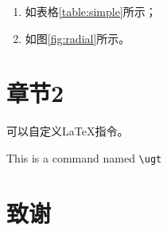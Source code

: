 \documentclass[titlepage,openany]{SHUugt}
\begin{document}
\begin{enumerate}
\def\labelenumi{\arabic{enumi}.}
\tightlist
\item
  如表格\ref{table:simple}所示；
\item
  如图\ref{fig:radial}所示。
\end{enumerate}

\chapter{章节2}\label{ux7ae0ux82822}

可以自定义LaTeX指令。

\newcommand{\ugt}{This is a command named \texttt{{\textbackslash}ugt}}

\ugt

\chapter*{致\hspace{2em}谢}


\backmatter
\nocite{*}


\end{document}
